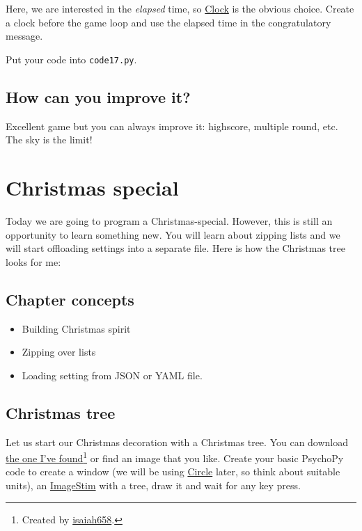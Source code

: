 \documentclass[
]{book}
\providecommand{\tightlist}{%
  \setlength{\itemsep}{0pt}\setlength{\parskip}{0pt}}
\begin{document}
Here, we are interested in the \emph{elapsed} time, so \href{https://psychopy.org/api/clock.html\#psychopy.clock.Clock}{Clock} is the obvious choice. Create a clock before the game loop and use the elapsed time in the congratulatory message.

Put your code into \texttt{code17.py}.

\hypertarget{how-can-you-improve-it}{%
\section{How can you improve it?}\label{how-can-you-improve-it}}

Excellent game but you can always improve it: highscore, multiple round, etc. The sky is the limit!

\hypertarget{christmas-special}{%
\chapter{Christmas special}\label{christmas-special}}

Today we are going to program a Christmas-special. However, this is still an opportunity to learn something new. You will learn about zipping lists and we will start offloading settings into a separate file. Here is how the Christmas tree looks for me:

\hypertarget{chapter-concepts-6}{%
\section{Chapter concepts}\label{chapter-concepts-6}}

\begin{itemize}
\tightlist
\item
  Building Christmas spirit
\item
  Zipping over lists
\item
  Loading setting from JSON or YAML file.
\end{itemize}

\hypertarget{christmas-tree}{%
\section{Christmas tree}\label{christmas-tree}}

Let us start our Christmas decoration with a Christmas tree. You can download \href{material/pine-tree.png}{the one I've found}\footnote{Created by \href{https://openclipart.org/artist/isaiah658}{isaiah658}.} or find an image that you like. Create your basic PsychoPy code to create a window (we will be using \href{https://psychopy.org/api/visual/circle.html\#psychopy.visual.circle.Circle}{Circle} later, so think about suitable units), an \href{https://psychopy.org/api/visual/imagestim.html\#psychopy.visual.ImageStim}{ImageStim} with a tree, draw it and wait for any key press.
\end{document}
